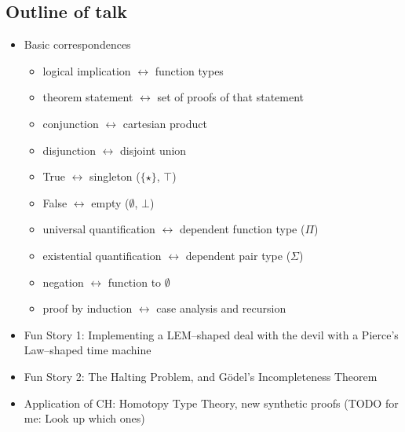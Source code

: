 \documentclass{article}
\begin{document}
\subsection*{Outline of talk}
\begin{itemize}
  \item
    Basic correspondences
    \begin{itemize}
      \item logical implication $\longleftrightarrow$ function types
      \item theorem statement $\longleftrightarrow$ set of proofs of that statement
      \item conjunction $\longleftrightarrow$ cartesian product
      \item disjunction $\longleftrightarrow$ disjoint union
      \item True $\longleftrightarrow$ singleton ($\{\star\}$, $\top$)
      \item False $\longleftrightarrow$ empty ($\emptyset$, $\bot$)
      \item universal quantification $\longleftrightarrow$ dependent function type ($\Pi$)
      \item existential quantification $\longleftrightarrow$ dependent pair type ($\Sigma$)
      \item negation $\longleftrightarrow$ function to $\emptyset$
      \item proof by induction $\longleftrightarrow$ case analysis and recursion
    \end{itemize}
  \item
    Fun Story 1: Implementing a LEM--shaped deal with the devil with a Pierce's Law--shaped time machine
  \item
    Fun Story 2: The Halting Problem, and G\"odel's Incompleteness Theorem
  \item
    Application of CH: Homotopy Type Theory, new synthetic proofs (TODO for me: Look up which ones)
\end{itemize}

\clearpage
\end{document}
